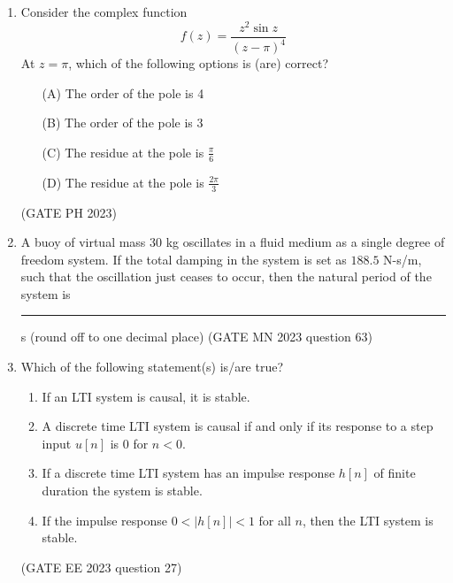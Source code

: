 \begin{enumerate}[label=\thechapter.\arabic*,ref=\thechapter.\theenumi]
\item Consider the complex function
\[ f(z) = \frac{z^{2}\sin z}{(z-\pi)^4} \]
At \( z = \pi \), which of the following options is (are) correct?
\begin{enumerate}[label=\textbf{\arabic*.}, font=\bfseries, align=left]
    \item[(A)] The order of the pole is 4 
    \item[(B)] The order of the pole is 3 
    \item[(C)] The residue at the pole is \( \frac{\pi}{6} \)
    \item[(D)] The residue at the pole is \( \frac{2\pi}{3} \)
\end{enumerate}
\hfill (GATE PH 2023)
\newpage
 \item
 A buoy of virtual mass $30$ kg oscillates in a fluid medium as a single degree of
freedom system. If the total damping in the system is set as $188.5$ N-s/m, such
that the oscillation just ceases to occur, then the natural period of the system is
\rule{1cm}{0.15mm} s (round off to one decimal place)
\hfill(GATE MN 2023 question 63)\\
\solution 

\newpage
\item 
Which of the following statement(s) is/are true?
\begin{enumerate}[label=(\alph*)]
	\item If an LTI system is causal, it is stable.
	\item A discrete time LTI system is causal if and only if its response to a step input $u[n]$ is 0 for $n < 0$.
	\item If a discrete time LTI system has an impulse response $h[n]$ of finite duration the system is stable.
	\item If the impulse response $0 < |h[n]| < 1$ for all $n$, then the LTI system is stable.
\end{enumerate}
\hfill (GATE EE 2023 question 27)\\
\solution

\newpage


\end{enumerate}
